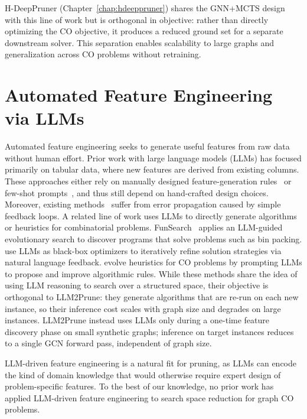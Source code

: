 H-DeepPruner (Chapter~\ref{chap:hdeeppruner}) shares the GNN+MCTS design with this line
of work but is orthogonal in objective: rather than directly optimizing the CO objective,
it produces a reduced ground set for a separate downstream solver. This separation enables
scalability to large graphs and generalization across CO problems without retraining.

\section{Automated Feature Engineering via LLMs}
Automated feature engineering seeks to generate useful features from raw data without
human effort. Prior work with large language models (LLMs) has focused primarily on
tabular data, where new features are derived from existing columns. These approaches
either rely on manually designed feature-generation
rules~\citep{zhang2023openfe, zhang2024dynamic} or few-shot
prompts~\citep{han2024large}, and thus still depend on hand-crafted design choices.
Moreover, existing methods~\citep{nam2024optimized, hollmann2023large} suffer from error
propagation caused by simple feedback loops. A related line of work uses LLMs to directly generate algorithms or heuristics for
combinatorial problems. FunSearch~\citep{romera2024mathematical} applies an
LLM-guided evolutionary search to discover programs that solve problems such as bin
packing. \citet{yang2023large} use LLMs as black-box optimizers to iteratively refine
solution strategies via natural language feedback. \citet{liu2024evolution} evolve
heuristics for CO problems by prompting LLMs to propose and improve algorithmic rules.
While these methods share the idea of using LLM reasoning to search over a structured
space, their objective is orthogonal to LLM2Prune: they generate algorithms that are
re-run on each new instance, so their inference cost scales with graph size and degrades
on large instances. LLM2Prune instead uses LLMs only during a one-time feature
discovery phase on small synthetic graphs; inference on target instances reduces to a
single GCN forward pass, independent of graph size.

LLM-driven feature engineering is a natural fit for pruning, as LLMs can encode the kind
of domain knowledge that would otherwise require expert design of problem-specific
features. To the best of our knowledge, no prior work has applied LLM-driven feature
engineering to search space reduction for graph CO problems.
